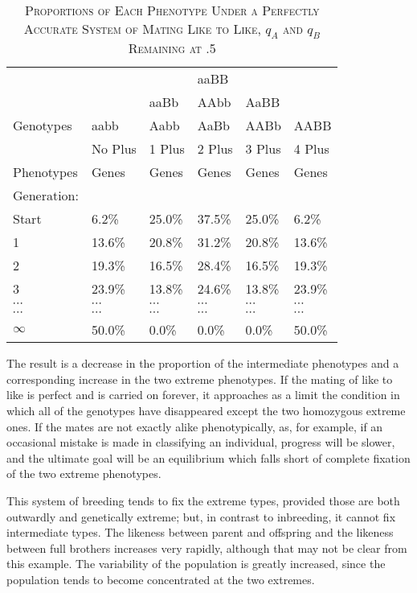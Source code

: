 \begin{table}[htbp]
	\centering
	\caption{\textsc{Proportions of Each Phenotype Under a Perfectly Accurate System of Mating
Like to Like,} $q_A$ \textsc{and} $q_B$ \textsc{Remaining at .5}}
	\label{tbl:Lush_Table_19}
	\begin{tabular}{C{2cm}|C{2cm}|C{2cm}|C{2cm}|C{2cm}|C{2cm}}
		\hline
		\hline
		~			& ~			& ~			& aa{BB}	& ~			& ~		\\
		~			& ~			& aaBb		& {AA}bb	& Aa{BB}	& ~		\\
		Genotypes	& aabb		& Aabb		& AaBb		& {AAB}b	& AABB	\\
		\hline
		~			& No Plus	& 1 Plus	& 2 Plus	& 3 Plus	& 4 Plus	\\
		Phenotypes	& Genes		& Genes		& Genes		& Genes		& Genes		\\	
		\hline
		Generation:	& ~			& ~			& ~			& ~			& ~			\\
		Start		& 6.2\%		& 25.0\%	& 37.5\%	& 25.0\%	& 6.2\%		\\
		1			& 13.6\%	& 20.8\%	& 31.2\%	& 20.8\%	& 13.6\%	\\
		2			& 19.3\%	& 16.5\%	& 28.4\%	& 16.5\%	& 19.3\%	\\
		3			& 23.9\%	& 13.8\%	& 24.6\%	& 13.8\%	& 23.9\%	\\
		$\cdots$	& $\cdots$	& $\cdots$	& $\cdots$	& $\cdots$	& $\cdots$	\\
		$\cdots$	& $\cdots$	& $\cdots$	& $\cdots$	& $\cdots$	& $\cdots$	\\
		$\infty$	& 50.0\%	& 0.0\%		& 0.0\%		& 0.0\%		& 50.0\%	\\
		\hline
	\end{tabular}
\end{table}

The result is a decrease in the proportion of the intermediate
phenotypes and a corresponding increase in the two extreme phenotypes.
If the mating of like to like is perfect and is carried on forever, it
approaches as a limit the condition in which all of the genotypes have
disappeared except the two homozygous extreme ones. If the mates are
not exactly alike phenotypically, as, for example, if an occasional mistake
is made in classifying an individual, progress will be slower, and
the ultimate goal will be an equilibrium which falls short of complete
fixation of the two extreme phenotypes.

This system of breeding tends to fix the extreme types, provided
those are both outwardly and genetically extreme; but, in contrast to
inbreeding, it cannot fix intermediate types. The likeness between parent
and offspring and the likeness between full brothers increases very
rapidly, although that may not be clear from this example. The variability
of the population is greatly increased, since the population tends
to become concentrated at the two extremes.

